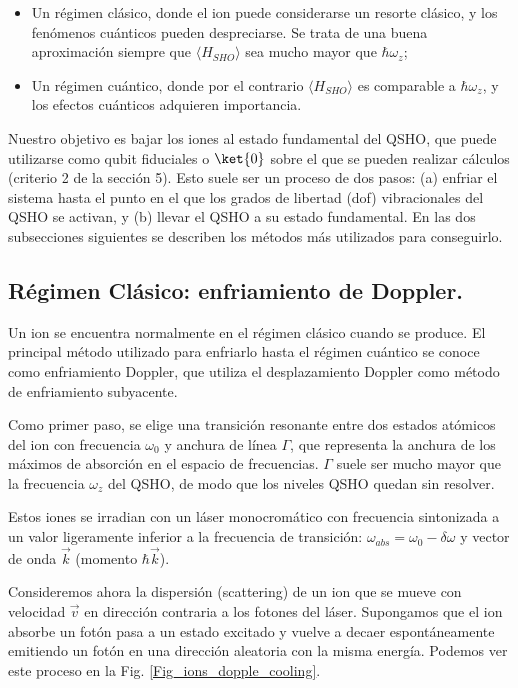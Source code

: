 \begin{itemize}
\item Un régimen clásico, donde el ion puede considerarse un resorte clásico, y los fenómenos cuánticos pueden despreciarse. Se trata de una buena aproximación siempre que $\langle H_{SHO} \rangle$ sea mucho mayor que $\hbar \omega_z$;

\item Un régimen cuántico, donde por el contrario $\langle H_{SHO} \rangle$ es comparable a $\hbar \omega_z$, y los efectos cuánticos adquieren importancia.
\end{itemize}

Nuestro objetivo es bajar los iones al estado fundamental del QSHO, que puede utilizarse como qubit fiduciales o $\ket{0}$ sobre el que se pueden realizar cálculos (criterio 2 de la sección 5). Esto suele ser un proceso de dos pasos: (a) enfriar el sistema hasta el punto en el que los grados de libertad (dof) vibracionales del QSHO se activan, y (b) llevar el QSHO a su estado fundamental. En las dos subsecciones siguientes se describen los métodos más utilizados para conseguirlo.


\subsection{Régimen Clásico: enfriamiento de Doppler.}


Un ion se encuentra normalmente en el régimen clásico cuando se produce. El principal método utilizado para enfriarlo hasta el régimen cuántico se conoce como enfriamiento Doppler, que utiliza el desplazamiento Doppler como método de enfriamiento subyacente. 

Como primer paso, se elige una transición resonante entre dos estados atómicos del ion con frecuencia $\omega_0$ y anchura de línea $\Gamma$, que representa la anchura de los máximos de absorción en el espacio de frecuencias. $\Gamma$ suele ser mucho mayor que la frecuencia $\omega_z$ del QSHO, de modo que los niveles QSHO quedan sin resolver. 

Estos iones se irradian con un láser monocromático con frecuencia sintonizada a un valor ligeramente inferior a la frecuencia de transición: $\omega_{abs} = \omega_0 - \delta \omega$ y vector de onda $\vec{k}$ (momento $\hbar \vec{k}$). 

Consideremos ahora la dispersión (scattering) de un ion que se mueve con velocidad $\vec{v}$ en dirección contraria a los fotones del láser. Supongamos que el ion absorbe un fotón pasa a un estado excitado y vuelve a decaer espontáneamente emitiendo un fotón en una dirección aleatoria con la misma energía. Podemos ver este proceso en la Fig. \ref{Fig_ions_dopple_cooling}.

